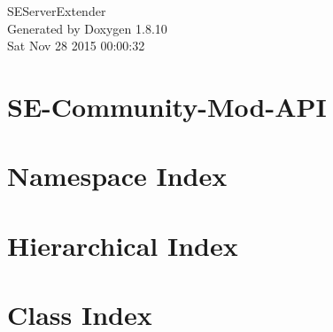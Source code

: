 \documentclass[twoside]{book}
\newcommand{\+}{\discretionary{\mbox{\scriptsize$\hookleftarrow$}}{}{}}
\newcommand{\clearemptydoublepage}{%
  \newpage{\pagestyle{empty}\cleardoublepage}%
}
\begin{document}
\hypersetup{pageanchor=false,
             bookmarks=true,
             bookmarksnumbered=true,
             pdfencoding=unicode
            }
\begin{titlepage}
\vspace*{7cm}
\begin{center}%
{\Large S\+E\+Server\+Extender }\\
\vspace*{1cm}
{\large Generated by Doxygen 1.8.10}\\
\vspace*{0.5cm}
{\small Sat Nov 28 2015 00:00:32}\\
\end{center}
\end{titlepage}
\clearemptydoublepage
\tableofcontents
\clearemptydoublepage
{}
\hypersetup{pageanchor=true}

\chapter{S\+E-\/\+Community-\/\+Mod-\/\+A\+P\+I}
\label{md__e_1__git_hub__s_e_server_extender__r_e_a_d_m_e}
\hypertarget{md__e_1__git_hub__s_e_server_extender__r_e_a_d_m_e}{}

\chapter{Namespace Index}

\chapter{Hierarchical Index}

\chapter{Class Index}

\end{document}
